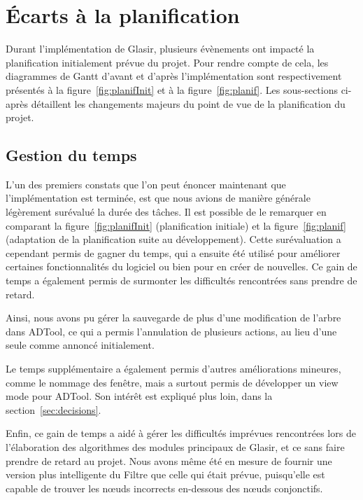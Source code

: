\section{Écarts à la planification}
\label{sec:ecarts}

Durant l'implémentation de Glasir, plusieurs évènements ont impacté la planification initialement prévue du projet. Pour rendre compte de cela, les diagrammes de Gantt d'avant et d'après l'implémentation sont respectivement présentés à la {\sc figure}~\ref{fig:planifInit} et à la {\sc figure}~\ref{fig:planif}. Les sous-sections ci-après détaillent les changements majeurs du point de vue de la planification du projet. 

\subsection{Gestion du temps}
\label{ssec:temps}

L'un des premiers constats que l'on peut énoncer maintenant que l'implémentation est terminée, est que nous avions de manière générale légèrement surévalué la durée des tâches. Il est possible de le remarquer en comparant la {\sc figure}~\ref{fig:planifInit} (planification initiale) et la {\sc figure}~\ref{fig:planif} (adaptation de la planification suite au développement). Cette surévaluation a cependant permis de gagner du temps, qui a ensuite été utilisé pour améliorer certaines fonctionnalités du logiciel ou bien pour en créer de nouvelles. Ce gain de temps a également permis de surmonter les difficultés rencontrées sans prendre de retard.

Ainsi, nous avons pu gérer la sauvegarde de plus d'une modification de l'arbre dans ADTool, ce qui a permis l'annulation de plusieurs actions, au lieu d'une seule comme annoncé initialement.

Le temps supplémentaire a également permis d'autres améliorations mineures, comme le nommage des fenêtre, mais a surtout permis de développer un \og view mode \fg{} pour ADTool. Son intérêt est expliqué plus loin, dans la {\sc section}~\ref{sec:decisions}.

Enfin, ce gain de temps a aidé à gérer les difficultés imprévues rencontrées lors de l'élaboration des algorithmes des modules principaux de Glasir, et ce sans faire prendre de retard au projet. Nous avons même été en mesure de fournir une version plus intelligente du Filtre que celle qui était prévue, puisqu'elle est capable de trouver les n\oe{}uds incorrects en-dessous des n\oe{}uds conjonctifs.

